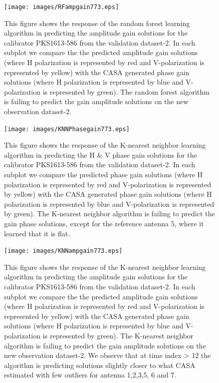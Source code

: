 \begin{figure}[H]
    \texttt{[image: images/RFampgain773.eps]}
    \caption{This figure shows the response of the random forest learning algorithm in predicting the amplitude gain solutions for the calibrator PKS1613-586 from the validation dataset-2. In each subplot we compare the the predicted amplitude gain solutions (where H polarization is represented by red and V-polarization is represented by yellow) with the CASA generated phase gain solutions (where H polarization is represented by blue and V-polarization is represented by green). The random forest algorithm is failing to predict the gain amplitude solutions on the new observation dataset-2.}
     \label{ra3}
\end{figure}

\begin{figure}[H]
    \texttt{[image: images/KNNPhasegain773.eps]}
    \caption{This figure shows the response of the K-nearest neighbor learning algorithm in predicting the H $\&$ V phase gain solutions for the calibrator PKS1613-586 from the validation dataset-2. In each subplot we compare the predicted phase gain solutions (where H polarization is represented by red and V-polarization is represented by yellow) with the CASA generated phase gain solutions (where H polarization is represented by blue and V-polarization is represented by green). The K-nearest neighbor algorithm is failing to predict the gain phase solutions, except for the reference antenna 5, where it learned that it is flat.}
    \label{obs11}
\end{figure}

\begin{figure}[H]
    \texttt{[image: images/KNNampgain773.eps]}
    \caption{This figure shows the response of the K-nearest neighbor learning algorithm in predicting the amplitude gain solutions for the calibrator PKS1613-586 from the validation dataset-2. In each subplot we compare the the predicted amplitude gain solutions (where H polarization is represented by red and V-polarization is represented by yellow) with the CASA generated phase gain solutions (where H polarization is represented by blue and V-polarization is represented by green). The K-nearest neighbor algorithm is failing to predict the gain amplitude solutions on the new observation dataset-2. We observe that at time index > 12 the algorithm is predicting solutions slightly  closer to what CASA estimated with few outliers for antenna 1,2,3,5, 6 and 7.}
     \label{ka3}
\end{figure}

